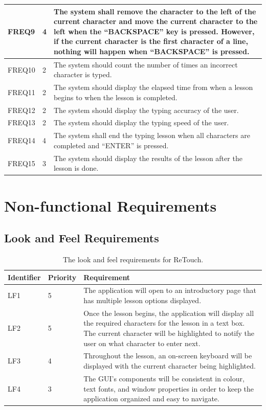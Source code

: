 \documentclass[12pt, titlepage]{article}
\begin{document}
\begin{longtable}{ |m{2cm}|m{1.8cm}|m{9.4cm}| }
    \hline
    FREQ9 & 4 & The system shall remove the character to the left of the current character and move the current character to the left when the “BACKSPACE” key is pressed. However, if the current character is the first character of a line, nothing will happen when “BACKSPACE” is pressed. \\ 
    \hline
    FREQ10 & 2 & The system should count the number of times an incorrect character is typed. \\ 
    \hline
    FREQ11 & 2 & The system should display the elapsed time from when a lesson begins to when the lesson is completed. \\ 
    \hline
    FREQ12 & 2 & The system should display the typing accuracy of the user. \\ 
    \hline
    FREQ13 & 2 & The system should display the typing speed of the user. \\ 
    \hline
    FREQ14 & 4 & The system shall end the typing lesson when all characters are completed and “ENTER” is pressed. \\ 
    \hline
    FREQ15 & 3 & {\color{cyan}The system should display the results of the lesson after the lesson is done. }\\ 
    \hline

\end{longtable}

\section{Non-functional Requirements}
\subsection{Look and Feel Requirements}

\begin{table}[H]
  \caption{The look and feel requirements for ReTouch.}
\begin{tabular}{ |m{2cm}|m{1.8cm}|m{9.4cm}| }
    \hline
    \textbf{Identifier} & \textbf{Priority} & \textbf{Requirement} \\ 
    \hline
    {\color{cyan}LF1} & 5 & The application will open to an introductory page that has multiple lesson options displayed. \\ 
    \hline
    {\color{cyan}LF2} & 5 & Once the lesson begins, the application will display all the required characters for the lesson in a text box. The current character will be highlighted to notify the user on what character to enter next. \\ 
    \hline
    {\color{cyan}LF3} & 4 & Throughout the lesson, an on-screen keyboard will be displayed with the current character being highlighted. \\ 
    \hline
    {\color{cyan}LF4} & 3 & The GUI's components will be consistent in colour, text fonts, and window properties in order to keep the application organized and easy to navigate. \\ 
    \hline
\end{tabular}
\end{table}
\end{document}
